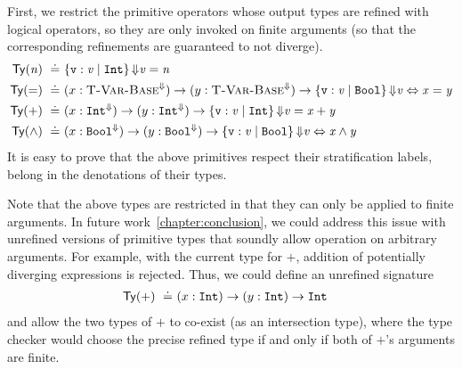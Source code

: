 First, we restrict the primitive operators whose output 
types are refined with logical operators, so they are only 
invoked on finite arguments (so that the corresponding 
refinements are guaranteed to not diverge).
%
\begin{align*}
  \constty{\mathtt{\n}} \defeq & \tlref{\vv}{\tint}{\finite}{\vv = \n} \\
  \constty{\mathtt{=}} \defeq & \tfun{x}
                                     {\tbase^\finite}
                                     {\tfun{y}
                                           {\tbase^\finite}
                                           {\tlref{\vv}{\tbool}{\finite}{\vv \Leftrightarrow \x = \y}}} \\
  \constty{\mathtt{+}} \defeq & \tfun{x}
                                     {\tint^\finite}
                                     {\tfun{y}
                                           {\tint^\finite}
                                           {\tlref{\vv}{\tint}{\finite}{\vv = \x + \y}}}\\
  \constty{\mathtt{\land}} \defeq & \tfun{x}
                                         {\tbool^\finite}
                                         {\tfun{y}
                                               {\tbool^\finite}
                                               {\tlref{\vv}{\tbool}{\finite}{\vv \Leftrightarrow \x \land \y}}}
\end{align*}
%
It is easy to prove that the above primitives respect 
their stratification labels, \ie belong in the denotations
of their types. 

Note that the above types are restricted in that they can only be applied to finite arguments.
%
In future work~\ref{chapter:conclusion}, we could address this issue with unrefined versions of primitive types
that soundly allow operation on arbitrary arguments.
%
For example, with the current type for $\mathtt{+}$, addition of potentially 
diverging expressions is rejected.
%
Thus, we could define an unrefined signature 
\begin{align*}
  \mathsf{Ty}({\mathtt{+}}) \ \doteq\  & {(x:\mathtt{Int})} \rightarrow {(y:\ensuremath{\mathtt{Int}})} \rightarrow \mathtt{Int}
\end{align*}
and allow the two types of $\mathtt{+}$ to co-exist (as an intersection type),
where the type checker would choose the precise refined type 
if and only if both of $\mathtt{+}$'s arguments are finite.

